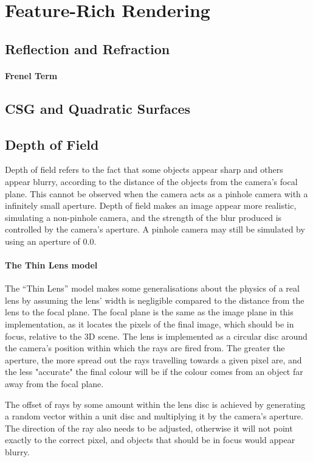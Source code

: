 \documentclass[a4paper]{article}
\begin{document}
\section{Feature-Rich Rendering}
\subsection{Reflection and Refraction}\label{ss:reflandrefr}


\paragraph{Frenel Term}

\subsection{CSG and Quadratic Surfaces}

\subsection{Depth of Field}\label{ss:depthoffield}
Depth of field refers to the fact that some objects appear sharp and others appear blurry, according to the distance of the objects from the camera's focal plane. This cannot be observed when the camera acts as a pinhole camera with a infinitely small aperture. Depth of field makes an image appear more realistic, simulating a non-pinhole camera, and the strength of the blur produced is controlled by the camera's aperture. A pinhole camera may still be simulated by using an aperture of $0.0$.

\paragraph{The Thin Lens model}
The ``Thin Lens'' model makes some generalisations about the physics of a real lens by assuming the lens' width is negligible compared to the distance from the lens to the focal plane. The focal plane is the same as the image plane in this implementation, as it locates the pixels of the final image, which should be in focus, relative to the 3D scene. The lens is implemented as a circular disc around the camera's position within which the rays are fired from. The greater the aperture, the more spread out the rays travelling towards a given pixel are, and the less "accurate" the final colour will be if the colour comes from an object far away from the focal plane.

The offset of rays by some amount within the lens disc is achieved by generating a random vector within a unit disc and multiplying it by the camera's aperture. The direction of the ray also needs to be adjusted, otherwise it will not point exactly to the correct pixel, and objects that should be in focus would appear blurry.
\end{document}
